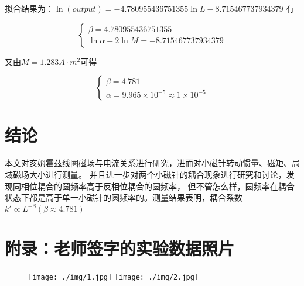 \documentclass{article}
\begin{document}
拟合结果为：$\ln(output)=-4.780955436751355\ln L-8.715467737934379$
有

$$\begin{cases}
    \beta=4.780955436751355 \\
    \ln \alpha+2\ln M=-8.715467737934379
\end{cases}$$

又由$M=1.283A\cdot m^2$可得

$$\begin{cases}
    \beta=4.781 \\
    \alpha=9.965\times 10^{-5} \approx 1\times 10^{-5}
\end{cases}$$

\section{结论}
本文对亥姆霍兹线圈磁场与电流关系进行研究，进而对小磁针转动惯量、磁矩、局域磁场大小进行测量。
并且进一步对两个小磁针的耦合现象进行研究和讨论，发现同相位耦合的圆频率高于反相位耦合的圆频率，
但不管怎么样，圆频率在耦合状态下都是高于单一小磁针的圆频率的。测量结果表明，耦合系数$k'\propto L^{-\beta}(\beta \approx4.781)$

\newpage
\section*{附录：老师签字的实验数据照片}

\begin{figure}[H]
    \centering
    \texttt{[image: ./img/1.jpg]}
    \texttt{[image: ./img/2.jpg]}
\end{figure}
\end{document}
